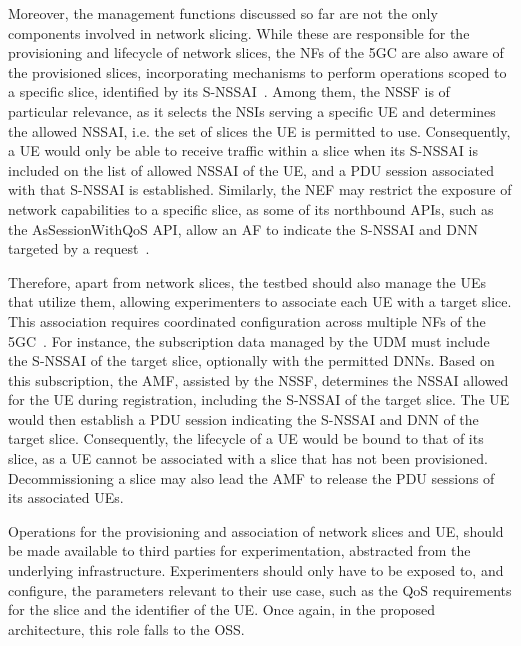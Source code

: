 Moreover, the management functions discussed so far are not the only components involved in network slicing. While these are responsible for the provisioning and lifecycle of network slices, the \acsp{NF} of the \acs{5GC} are also aware of the provisioned slices, incorporating mechanisms to perform operations scoped to a specific slice, identified by its \acs{S-NSSAI}~\cite{ETSI_TS_123_501_V16_9_0}. Among them, the \acs{NSSF} is of particular relevance, as it selects the \acsp{NSI} serving a specific \acs{UE} and determines the allowed \acs{NSSAI}, i.e. the set of slices the \acs{UE} is permitted to use. Consequently, a \acs{UE} would only be able to receive traffic within a slice when its \acs{S-NSSAI} is included on the list of allowed \acs{NSSAI} of the \acs{UE}, and a \acs{PDU} session associated with that \acs{S-NSSAI} is established. Similarly, the \acs{NEF} may restrict the exposure of network capabilities to a specific slice, as some of its northbound \acsp{API}, such as the AsSessionWithQoS \acs{API}, allow an \acs{AF} to indicate the \acs{S-NSSAI} and \acs{DNN} targeted by a request~\cite{ETSI_TS_129_122_V18_8_0}.

Therefore, apart from network slices, the testbed should also manage the \acsp{UE} that utilize them, allowing experimenters to associate each \acs{UE} with a target slice. This association requires coordinated configuration across multiple \acsp{NF} of the \acs{5GC}~\cite{ETSI_TS_123_501_V16_9_0}. For instance, the subscription data managed by the \acs{UDM} must include the \acs{S-NSSAI} of the target slice, optionally with the permitted \acsp{DNN}. Based on this subscription, the \acs{AMF}, assisted by the \acs{NSSF}, determines the \acs{NSSAI} allowed for the \acs{UE} during registration, including the \acs{S-NSSAI} of the target slice. The \acs{UE} would then establish a \acs{PDU} session indicating the \acs{S-NSSAI} and \acs{DNN} of the target slice. Consequently, the lifecycle of a \acs{UE} would be bound to that of its slice, as a \acs{UE} cannot be associated with a slice that has not been provisioned. Decommissioning a slice may also lead the \acs{AMF} to release the \acs{PDU} sessions of its associated \acsp{UE}.

Operations for the provisioning and association of network slices and \acs{UE}, should be made available to third parties for experimentation, abstracted from the underlying infrastructure. Experimenters should only have to be exposed to, and configure, the parameters relevant to their use case, such as the \acs{QoS} requirements for the slice and the identifier of the \acs{UE}. Once again, in the proposed architecture, this role falls to the \acs{OSS}.

